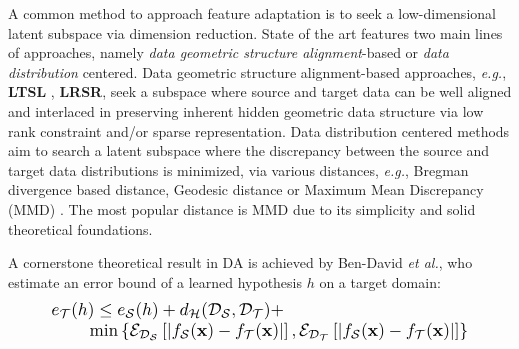 \documentclass[journal,twocolumn]{IEEEtran}
\newcommand\ying[1]{{\footnotesize \color{red}[#1 - \textbf{Ying}]}}
\begin{document}
\begin{CJK*}{UTF8}{gkai}
A common method to approach feature adaptation is to seek a low-dimensional latent subspace\cite{7078994,Busto_2017_ICCV} via dimension reduction.  State of the art  features two main lines of approaches, namely \textit{data geometric structure alignment}-based or \textit{data distribution} centered. Data geometric structure alignment-based approaches, \textit{e.g.}, \textbf{LTSL}\cite{DBLP:journals/ijcv/ShaoKF14} , \textbf{LRSR}\cite{DBLP:journals/tip/XuFWLZ16},  seek a subspace where source and target data can be well aligned and interlaced in preserving inherent hidden geometric data structure via low rank constraint and/or sparse representation.  Data distribution centered methods aim to search a latent subspace where the discrepancy between the source and target data distributions is minimized, via various distances, \textit{e.g.}, Bregman divergence\cite{4967588} based distance, Geodesic distance\cite{gong2012geodesic} or Maximum Mean Discrepancy (MMD) \cite{gretton2012kernel}. The most popular distance is MMD due to its simplicity and solid theoretical foundations. 


A cornerstone theoretical result in DA \cite{ben2010theory,kifer2004detecting} is achieved by  Ben-David \textit{et al.}, who estimate an error bound of a learned hypothesis $h$ on a  target domain:  
% 
% 
\vspace{-5pt} 
\begin{equation}\label{eq:bound}
		\resizebox{0.90\hsize}{!}{%
			$\begin{array}{l}
			{e_{\cal T}}(h) \le {e_{\cal S}}(h) + {d_{\cal H}}({{\cal D}_{\cal S}},{{\cal D}_{\cal T}})+ \\
			\;\;\;\;\;\;\;\; \min \left\{ {{{\cal E}_{{{\cal D}_{\cal S}}}}\left[ {\left| {{f_{\cal S}}({\bf{x}}) - {f_{\cal T}}({\bf{x}})} \right|} \right],{{\cal E}_{{{\cal D}_{\cal T}}}}\left[ {\left| {{f_{\cal S}}({\bf{x}}) - {f_{\cal T}}({\bf{x}})} \right|} \right]} \right\}
			\end{array}$}
	\end{equation}
	\vspace{-10pt} 
	

\end{CJK*}
\end{document}
